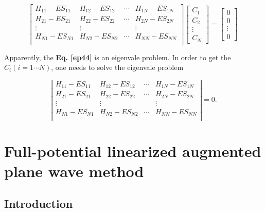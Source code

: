 \documentclass[a4paper, 12pt, titlepage,oneside,drop]{kthesis}
\begin{document}
\begin{equation}\label{ep44}
\left[
\begin{matrix}
    H_{11} - E S_{11} & H_{12} - E S_{12} & \cdots & H_{1N} - E S_{1N} \\
   H_{21} - E S_{21} & H_{22} - E S_{22} & \cdots & H_{2N} - E S_{2N} \\
    \vdots               & \vdots               &        & \vdots               \\
  H_{N1} - E S_{N1} & H_{N2} - E S_{N2} & \cdots & H_{NN} - E S_{NN} \\
\end{matrix} \right] \left[ \begin{array}{c} C_1 \\ C_2 \\ \vdots \\ C_N\end{array} \right]
= \left[ \begin{array}{c} 0 \\ 0 \\ \vdots \\ 0 \end{array} \right].
\end{equation}

Apparently, the \textbf{Eq. \ref{ep44}} is an eigenvale problem. In order to get the $C_{i} (i = 1 \cdots N)$, one needs to solve the eigenvale problem

\begin{equation}\label{ep4}
\left|
\begin{matrix}
    H_{11} - E S_{11} & H_{12} - E S_{12} & \cdots & H_{1N} - E S_{1N} \\
   H_{21} - E S_{21} & H_{22} - E S_{22} & \cdots & H_{2N} - E S_{2N} \\
    \vdots               & \vdots               &        & \vdots               \\
  H_{N1} - E S_{N1} & H_{N2} - E S_{N2} & \cdots & H_{NN} - E S_{NN} \\
\end{matrix} \right|
 = 0.
\end{equation}

\section{Full-potential linearized augmented plane wave method}
\subsection{Introduction}
\end{document}
